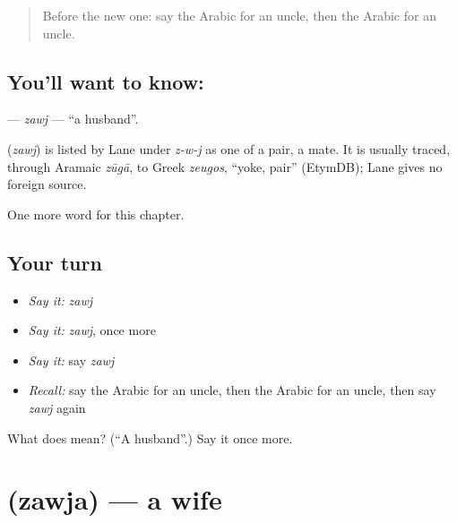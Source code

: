 \label{lesson:AR-C55-zawj}



\begin{quote}
Before the new one: say the Arabic for an uncle, then the Arabic for an uncle.
\end{quote}

\subsection*{You'll want to know: }
\textbf{} — \emph{zawj} — \textquotedblleft{}a husband\textquotedblright{}.

\begin{cousinweb}
\textbf{} (\emph{zawj}) is listed by Lane under \emph{z-w-j} as one of a pair, a mate. It is usually traced, through Aramaic \emph{zūgā}, to Greek \emph{zeugos}, \textquotedblleft{}yoke, pair\textquotedblright{} (EtymDB); Lane gives no foreign source.
\end{cousinweb}

\begin{grammarlens}[title={What you've built}]
One more word for this chapter.
\end{grammarlens}

\subsection*{Your turn}
\begin{itemize}
\raggedright
  \item \emph{Say it:} \emph{zawj}
  \item \emph{Say it:} \emph{zawj}, once more
  \item \emph{Say it:} say \emph{zawj}
  \item \emph{Recall:} say the Arabic for an uncle, then the Arabic for an uncle, then say \emph{zawj} again
\end{itemize}

\begin{tcolorbox}[breakable,colback=teal!4,colframe=teal!35!black,title={Before you move on}]
What does  mean? (\textquotedblleft{}A husband\textquotedblright{}.) Say it once more.
\end{tcolorbox}
\section[\texorpdfstring{\ar{زوجة} (zawja)}{زوجة (zawja)}]{ (zawja) — a wife}

